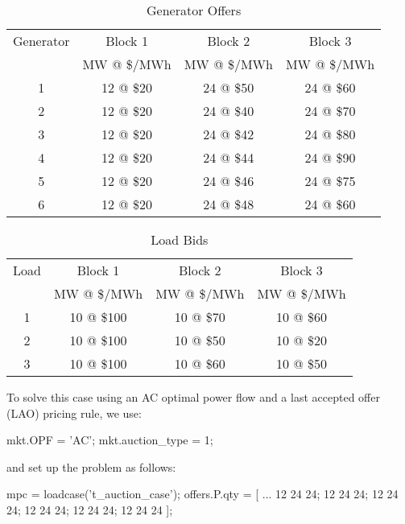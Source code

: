 \documentclass[12pt]{article}
\numberwithin{equation}{section}
\numberwithin{table}{section}
\numberwithin{figure}{section}
\begin{document}
\begin{appendices}
\begin{table}[!ht]
\centering
\begin{threeparttable}
\caption{Generator Offers}
\label{tab:offers}
\footnotesize
\begin{tabular}{cccc}
\toprule
Generator & Block 1 & Block 2 & Block 3 \\
 & MW @ \$/MWh & MW @ \$/MWh & MW @ \$/MWh \\
\midrule
1	& 12 @ \$20	& 24 @ \$50	& 24 @ \$60	\\
2	& 12 @ \$20	& 24 @ \$40	& 24 @ \$70	\\
3	& 12 @ \$20	& 24 @ \$42	& 24 @ \$80	\\
4	& 12 @ \$20	& 24 @ \$44	& 24 @ \$90	\\
5	& 12 @ \$20	& 24 @ \$46	& 24 @ \$75	\\
6	& 12 @ \$20	& 24 @ \$48	& 24 @ \$60	\\
\bottomrule
\end{tabular}
\end{threeparttable}
\end{table}

\begin{table}[!ht]
\centering
\begin{threeparttable}
\caption{Load Bids}
\label{tab:bids}
\footnotesize
\begin{tabular}{cccc}
\toprule
Load & Block 1 & Block 2 & Block 3 \\
 & MW @ \$/MWh & MW @ \$/MWh & MW @ \$/MWh \\
\midrule
1	& 10 @ \$100	& 10 @ \$70	& 10 @ \$60	\\
2	& 10 @ \$100	& 10 @ \$50	& 10 @ \$20	\\
3	& 10 @ \$100	& 10 @ \$60	& 10 @ \$50	\\
\bottomrule
\end{tabular}
\end{threeparttable}
\end{table}

To solve this case using an AC optimal power flow and a last accepted offer (LAO) pricing rule, we use:

\begin{Code}
mkt.OPF = 'AC';
mkt.auction_type = 1;
\end{Code}
\pagebreak
\noindent
and set up the problem as follows:
\begin{Code}
mpc = loadcase('t_auction_case');
offers.P.qty = [ ...
	12 24 24;
	12 24 24;
	12 24 24;
	12 24 24;
	12 24 24;
	12 24 24 ];


\end{Code}
\end{appendices}
\end{document}
